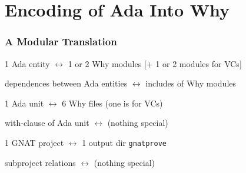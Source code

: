 \documentclass{beamer}
\newcommand{\vs}{\vspace{0.5cm}}
\newenvironment{specialframe}{%
  \begin{frame}[fragile,environment=specialframe]}{\end{frame}}
\begin{document}


\section{Encoding of Ada Into Why}

\begin{specialframe}\frametitle{A Modular Translation}
  1 Ada entity $\longleftrightarrow$ 1 or 2 Why modules [+ 1 or 2 modules for VCs]

  \vs

  dependences between Ada entities $\longleftrightarrow$ includes of Why modules

\pause
  \vs

  1 Ada unit $\longleftrightarrow$ 6 Why files (one is for VCs)

  \vs

  with-clause of Ada unit $\longleftrightarrow$ (nothing special)

\pause
  \vs

  1 GNAT project $\longleftrightarrow$ 1 output dir \verb|gnatprove|

  \vs

  subproject relations $\longleftrightarrow$ (nothing special)

\end{specialframe}
\end{document}
